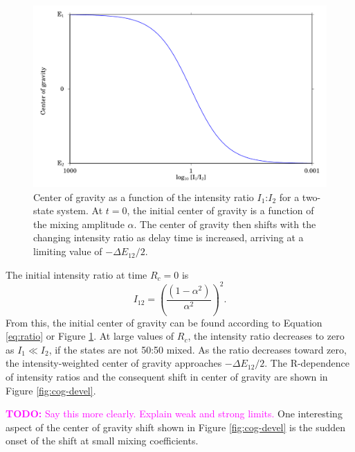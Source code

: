 \documentclass[12pt]{mitthesis}
\newcommand{\TODO} [1]{\textcolor{magenta}{\textbf{TODO:} #1}}
\begin{document}
\begin{figure}
  \caption{Center of gravity as a function of the intensity ratio
    $I_1$:$I_2$ for a two-state system.  At $t=0$, the initial center
    of gravity is a function of the mixing amplitude $\alpha$.  The
    center of gravity then shifts with the changing intensity ratio as
    delay time is increased, arriving at a limiting value of $-\Delta
    E_{12}/2$.}
  \label{fig:ratio}
  \centering
  \includegraphics[width=6in]{cog-from-ratio.pdf}
\end{figure}

The initial intensity ratio at time $R_c=0$ is
\begin{equation}
  I_{12} = 
  \left(
    \frac{(1 - \alpha^2)}{\alpha^2}
  \right)^2.
\end{equation}
From this, the initial center of gravity can be found according to
Equation \ref{eq:ratio} or Figure \ref{fig:ratio}.  At large values of
$R_c$, the intensity ratio decreases to zero as $I_1 \ll I_2$, if the
states are not 50:50 mixed.  As the ratio decreases toward zero, the
intensity-weighted center of gravity approaches $-\Delta E_{12} / 2$.
The R-dependence of intensity ratios and the consequent shift in
center of gravity are shown in Figure \ref{fig:cog-devel}.  

\TODO{Say this more clearly.  Explain weak and strong limits.} One
interesting aspect of the center of gravity shift shown in Figure
\ref{fig:cog-devel} is the sudden onset of the shift at small mixing
coefficients.
\end{document}
